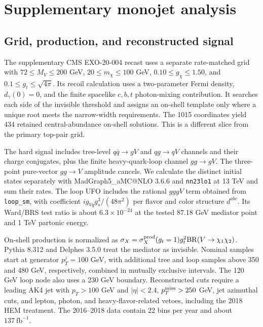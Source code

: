 \appendix
{}

\section{Supplementary monojet analysis}
\label{sec:monojet_method}

\subsection{Grid, production, and reconstructed signal}
\label{sec:monojet_grid}

The supplementary CMS EXO-20-004 recast uses a separate rate-matched grid with $72\le M_V\le200$ GeV, $20\le m_\chi\le100$ GeV, $0.10\le g_\chi\le1.50$, and $0.1\le g_t\le\sqrt{4\pi}$. Its recoil calculation uses a two-parameter Fermi density, $d_\gamma(0)=0$, and the finite spacelike $c,b,t$ photon-mixing contribution. It searches each side of the invisible threshold and assigns an on-shell template only where a unique root meets the narrow-width requirements. The 1015 coordinates yield 434 retained central-abundance on-shell solutions. This is a different slice from the primary top-pair grid.

The hard signal includes tree-level $q\bar q\to gV$ and $qg\to qV$ channels and their charge conjugates, plus the finite heavy-quark-loop channel $gg\to gV$. The three-point pure-vector $gg\to V$ amplitude cancels. We calculate the distinct initial states separately with MadGraph5\_aMC@NLO 3.6.6 and \texttt{nn23lo1} at 13 TeV and sum their rates. The loop UFO includes the rational $gggV$ term obtained from \texttt{loop\_sm}, with coefficient $i g_{Vq}g_s^3/(48\pi^2)$ per flavor and color structure $d^{abc}$. Its Ward/BRS test ratio is about $6.3\times10^{-24}$ at the tested 87.18 GeV mediator point and 1 TeV partonic energy. \cite{alwall2014,hirschi2015,cox2016}

On-shell production is normalized as $\sigma_X=\sigma_X^{\rm prod}(g_t=1)g_t^2\mathrm{BR}(V\to\chi_1\chi_2)$. Pythia 8.312 and Delphes 3.5.0 treat the mediator as invisible. Nominal samples start at generator $p_T^j=100$ GeV, with additional tree and loop samples above 350 and 480 GeV, respectively, combined in mutually exclusive intervals. The 120 GeV loop node also uses a 230 GeV boundary. Reconstructed cuts require a leading AK4 jet with $p_T>100$ GeV and $|\eta|<2.4$, $p_T^{\rm miss}>250$ GeV, jet azimuthal cuts, and lepton, photon, and heavy-flavor-related vetoes, including the 2018 HEM treatment. The 2016--2018 data contain 22 bins per year and about $137\ \mathrm{fb}^{-1}$. \cite{pythia2022,delphes2014,cmsmonojet,albert2021}

